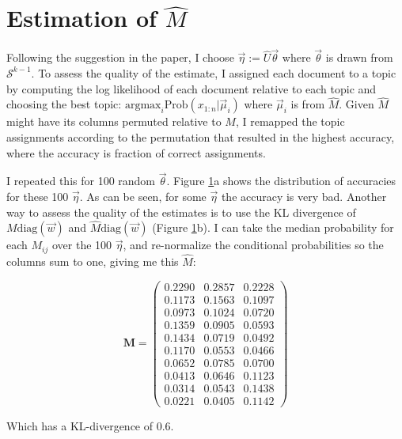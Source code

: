 \documentclass[10pt]{article}
\begin{document}
\section{Estimation of $\hat{M}$}

Following the suggestion in the paper, I choose $\vec{\eta} := \hat{U}\vec{\theta}$ where $\vec{\theta}$ is drawn from $\mathcal{S}^{k-1}$. 
To assess the quality of the estimate, I assigned each document to a topic by computing the log likelihood of each document relative to each topic and choosing the best topic: $\mathrm{argmax}_i \mathrm{Prob}(x_{1:n} | \vec{\mu}_i )$ where $\vec{\mu}_i$ is from $\hat{M}$. Given $\hat{M}$ might have its columns permuted relative to $M$, I remapped the topic assignments according to the permutation that resulted in the highest accuracy, where the accuracy is fraction of correct assignments. 

I repeated this for 100 random $\vec{\theta}$. Figure \ref{accuracies}a shows the distribution of accuracies for these 100 $\vec{\eta}$. As can be seen, for some $\vec{\eta}$ the accuracy is very bad.
Another way to assess the quality of the estimates is to use the KL divergence of $M \mathrm{diag}(\vec{w})$ and $\hat{M} \mathrm{diag}(\vec{w})$ (Figure \ref{accuracies}b).
I can take the median probability for each $M_{ij}$ over the 100 $\vec{\eta}$, and re-normalize the conditional probabilities so the columns sum to one, giving me this $\hat{M}$:

\begin{displaymath}
\mathbf{M} = 
\left( \begin{array}{ccc} 
0.2290 & 0.2857 & 0.2228 \\
0.1173 & 0.1563 & 0.1097 \\
0.0973 & 0.1024 & 0.0720 \\
0.1359 & 0.0905 & 0.0593 \\
0.1434 & 0.0719 & 0.0492 \\
0.1170 & 0.0553 & 0.0466 \\
0.0652 & 0.0785 & 0.0700 \\
0.0413 & 0.0646 & 0.1123 \\
0.0314 & 0.0543 & 0.1438 \\
0.0221 & 0.0405 & 0.1142
\end{array} \right)
\end{displaymath}

Which has a KL-divergence of 0.6.

\begin{figure}[btp]
\begin{center}
\caption{}
\label{accuracies}
\end{center}
\end{figure}
\end{document}

